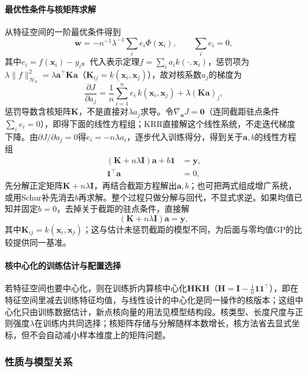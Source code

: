 \paragraph{最优性条件与核矩阵求解}

从特征空间的一阶最优条件得到
\[
  \bm{w}=-n^{-1}\lambda^{-1}\sum_i e_i\Phi(\bm{x}_i),\qquad \sum_i e_i=0,
\]
其中$e_i=f(\bm{x}_i)-y_i$。代入表示定理$f=\sum_i a_i k(\cdot,\bm{x}_i)$，惩罚项为$\lambda\lVert f\rVert^2_{\mathcal H_k}=\lambda\bm{a}^{\top}\bm{K}\bm{a}$（$\bm{K}_{ij}=k(\bm{x}_i,\bm{x}_j)$），故对核系数$a_j$的梯度为
\begin{equation}
  \frac{\partial J}{\partial a_j}
  =\frac1n\sum_{i=1}^{n}e_i\,k(\bm{x}_i,\bm{x}_j)+\lambda(\bm{K}\bm{a})_j,
  \label{eq:regression-krr-grad-a}
\end{equation}
惩罚导数含核矩阵$\bm{K}$，不是直接对$\lambda a_j$求导。令$\nabla_{\bm a}J=\bm 0$（连同截距驻点条件$\sum_i e_i=0$），即得下面的线性方程组；KRR直接解这个线性系统，不走迭代梯度下降。由$\partial J/\partial a_j=0$得$e_i=-n\lambda a_i$，逐步代入训练得分，得到关于$\bm{a},b$的线性方程组
\[
  \begin{aligned}
    (\bm{K}+n\lambda\bm{I})\bm{a}+b\bm{1}&=\bm{y},\\
    \bm{1}^{\top}\bm{a}&=0,
  \end{aligned}
\]
先分解正定矩阵$\bm{K}+n\lambda\bm{I}$，再结合截距方程解出$\bm{a},b$；也可把两式组成增广系统，或用Schur补先消去$b$再求解。整个过程只做分解与回代，不显式求逆。如果均值已知并固定$b=0$，去掉关于截距的驻点条件，直接解
\begin{equation}
  (\bm{K}+n\lambda\bm{I})\bm{a}=\bm{y},
  \label{eq:regression-krr-dual}
\end{equation}
其中$\bm{K}_{ij}=k(\bm{x}_i,\bm{x}_j)$；这与估计未惩罚截距的模型不同，为后面与零均值GP的比较提供同一基准。

\paragraph{核中心化的训练估计与配置选择}

若特征空间也要中心化，则在训练折内算核中心化$\bm{H}\bm{K}\bm{H}$（$\bm{H}=\bm{I}-\frac1n\mathbf{1}\mathbf{1}^{\top}$），即在特征空间里减去训练特征均值，与线性设计的中心化是同一操作的核版本；这组中心化只由训练数据估计，新点核向量的用法见模型结构段。核类型、长度尺度与正则强度$\lambda$在训练内共同选择；核矩阵存储与分解随样本数增长，核方法省去显式坐标，但不会自动减小样本维度上的矩阵问题。

\subsubsection{性质与模型关系}
\label{sec:regression-krr-theory}

